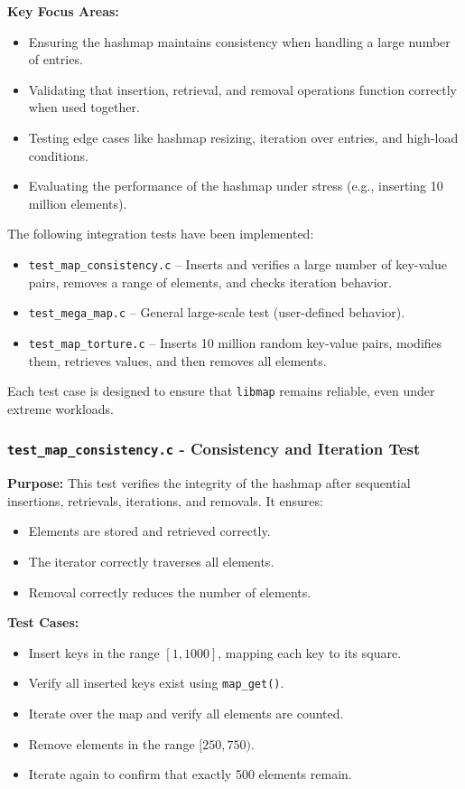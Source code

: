 \documentclass[titlepage]{article}
\begin{document}
\textbf{Key Focus Areas:}
\begin{itemize}
    \item Ensuring the hashmap maintains consistency when handling a large number of entries.
    \item Validating that insertion, retrieval, and removal operations function correctly when used together.
    \item Testing edge cases like hashmap resizing, iteration over entries, and high-load conditions.
    \item Evaluating the performance of the hashmap under stress (e.g., inserting 10 million elements).
\end{itemize}

The following integration tests have been implemented:
\begin{itemize}
    \item \texttt{test\_map\_consistency.c} -- Inserts and verifies a large number of key-value pairs, removes a range of elements, and checks iteration behavior.
    \item \texttt{test\_mega\_map.c} -- General large-scale test (user-defined behavior).
    \item \texttt{test\_map\_torture.c} -- Inserts 10 million random key-value pairs, modifies them, retrieves values, and then removes all elements.
\end{itemize}

Each test case is designed to ensure that \texttt{libmap} remains reliable, even under extreme workloads.

\subsubsection{\texttt{test\_map\_consistency.c} - Consistency and Iteration Test}

\textbf{Purpose:}
This test verifies the integrity of the hashmap after sequential insertions, retrievals, iterations, and removals.
It ensures:
\begin{itemize}
    \item Elements are stored and retrieved correctly.
    \item The iterator correctly traverses all elements.
    \item Removal correctly reduces the number of elements.
\end{itemize}

\textbf{Test Cases:}
\begin{itemize}
    \item Insert keys in the range $[1, 1000]$, mapping each key to its square.
    \item Verify all inserted keys exist using \texttt{map\_get()}.
    \item Iterate over the map and verify all elements are counted.
    \item Remove elements in the range $[250,750)$.
    \item Iterate again to confirm that exactly 500 elements remain.
\end{itemize}
\end{document}
